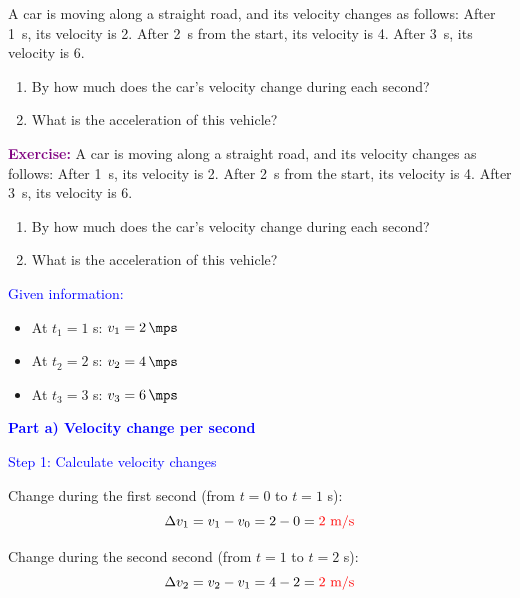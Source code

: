 \begin{exercise}
    A car is moving along a straight road, and its velocity changes as follows: After \qty{1}{\s}, its velocity is \qty{2}{\mps}. After \qty{2}{\s} from the start, its velocity is \qty{4}{\mps}. After \qty{3}{\s}, its velocity is \qty{6}{\mps}.

    \begin{enumerate}[label=\letraminuscula]
        \item By how much does the car's velocity change during each second?
        \item What is the acceleration of this vehicle?
    \end{enumerate}
    \begin{solu}
        \textbf{\textcolor{purple}{Exercise:}} A car is moving along a straight road, and its velocity changes as follows: After \qty{1}{\s}, its velocity is \qty{2}{\mps}. After \qty{2}{\s} from the start, its velocity is \qty{4}{\mps}. After \qty{3}{\s}, its velocity is \qty{6}{\mps}.
        \begin{enumerate}[label=\letraminuscula]
            \item By how much does the car's velocity change during each second?
            \item What is the acceleration of this vehicle?
        \end{enumerate}

        \vspace{0.3cm}

        \textcolor{blue}{Given information:}
        \begin{itemize}
            \item At $t_1 = 1$ s: $v_1 = \qty{2}{\mps}$
            \item At $t_2 = 2$ s: $v_2 = \qty{4}{\mps}$
            \item At $t_3 = 3$ s: $v_3 = \qty{6}{\mps}$
        \end{itemize}

        \textbf{\textcolor{blue}{Part a) Velocity change per second}}

        \textcolor{blue}{Step 1: Calculate velocity changes}

        Change during the first second (from $t=0$ to $t=1$ s):
        \[
            \Delta v_1 = v_1 - v_0 = 2 - 0 = \textcolor{red}{2 \text{ m/s}}
        \]

        Change during the second second (from $t=1$ to $t=2$ s):
        \[
            \Delta v_2 = v_2 - v_1 = 4 - 2 = \textcolor{red}{2 \text{ m/s}}
        \]


\end{solu}
\end{exercise}
